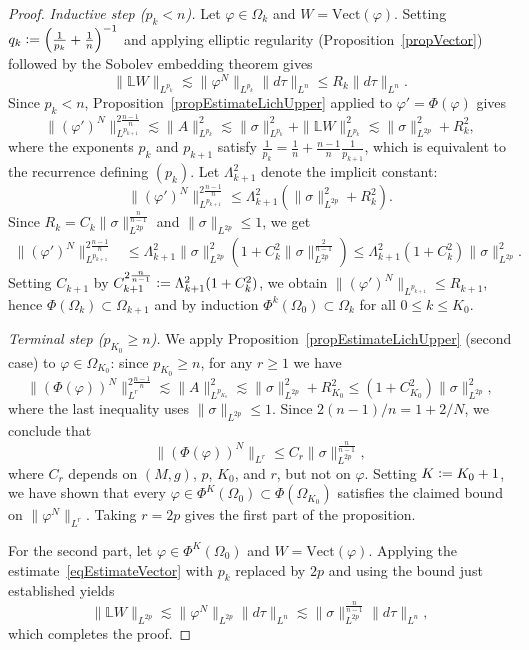 \documentclass[10pt,a4paper]{amsart}
\newcommand{\bL}{\mathbb{L}}
\newcommand{\definedas}{\mathrel{\raise.095ex\hbox{\rm :}\mkern-5.2mu=}}
\renewcommand{\phi}{\varphi}
\begin{document}
\begin{proof}
	\medskip\noindent\textit{Inductive step ($p_k < n$).}
	Let $\phi \in \Omega_k$ and $W = \mathrm{Vect}(\phi)$. Setting $q_k \definedas
		\left(\frac{1}{p_k}+\frac{1}{n}\right)^{-1}$ and applying elliptic regularity
	(Proposition~\ref{propVector}) followed by the Sobolev embedding theorem gives
	\begin{equation}\label{eqEstimateVector}
		\|\bL W\|_{L^{p_k}} \lesssim \|\phi^N\|_{L^{p_k}} \|d\tau\|_{L^n} \leq R_k \|d\tau\|_{L^n}.
	\end{equation}
	Since $p_k < n$, Proposition~\ref{propEstimateLichUpper} applied to $\phi' =
		\Phi(\phi)$ gives
	\[
		\|(\phi')^N\|_{L^{p_{k+1}}}^{2\frac{n-1}{n}}
		\lesssim \|A\|_{L^{p_k}}^2
		\lesssim \|\sigma\|_{L^{p_k}}^2 + \|\bL W\|_{L^{p_k}}^2
		\lesssim \|\sigma\|_{L^{2p}}^2 + R_k^2,
	\]
	where the exponents $p_k$ and $p_{k+1}$ satisfy $\frac{1}{p_k} = \frac{1}{n} +
		\frac{n-1}{n} \frac{1}{p_{k+1}}$, which is equivalent to the recurrence
	defining $(p_k)$. Let $\Lambda_{k+1}^2$ denote the implicit constant:
	\[
		\|(\phi')^N\|_{L^{p_{k+1}}}^{2\frac{n-1}{n}}
		\leq \Lambda_{k+1}^2 \left(\|\sigma\|_{L^{2p}}^2 + R_k^2\right).
	\]
	Since $R_k = C_k \|\sigma\|_{L^{2p}}^{\frac{n}{n-1}}$ and $\|\sigma\|_{L^{2p}}
		\leq 1$, we get
	\begin{align*}
		\|(\phi')^N\|_{L^{p_{k+1}}}^{2\frac{n-1}{n}}
		 & \leq \Lambda_{k+1}^2 \|\sigma\|_{L^{2p}}^2 \left(1 + C_k^2 \|\sigma\|_{L^{2p}}^{\frac{2}{n-1}}\right)
		\leq \Lambda_{k+1}^2 \left(1 + C_k^2\right) \|\sigma\|_{L^{2p}}^2.
	\end{align*}
	Setting $C_{k+1}$ by $C_{k+1}^{2\frac{n}{n-1}} \definedas \Lambda_{k+1}^2 (1 + C_k^2)$, we
	obtain $\|(\phi')^N\|_{L^{p_{k+1}}} \leq R_{k+1}$, hence $\Phi(\Omega_k) \subset
		\Omega_{k+1}$ and by induction $\Phi^k(\Omega_0) \subset \Omega_k$ for all
	$0 \leq k \leq K_0$.

	\medskip\noindent\textit{Terminal step ($p_{K_0} \geq n$).}
	We apply Proposition~\ref{propEstimateLichUpper} (second case) to
	$\phi \in \Omega_{K_0}$: since $p_{K_0} \geq n$, for any $r \geq 1$ we have
	\[
		\|(\Phi(\phi))^N\|_{L^r}^{2\frac{n-1}{n}}
		\lesssim \|A\|_{L^{p_{K_0}}}^2
		\lesssim \|\sigma\|_{L^{2p}}^2 + R_{K_0}^2
		\leq (1 + C_{K_0}^2)\|\sigma\|_{L^{2p}}^2,
	\]
	where the last inequality uses $\|\sigma\|_{L^{2p}} \leq 1$. Since $2(n-1)/n =
		1 + 2/N$, we conclude that
	\[
		\|(\Phi(\phi))^N\|_{L^r} \leq C_r \|\sigma\|_{L^{2p}}^{\frac{n}{n-1}},
	\]
	where $C_r$ depends on $(M, g)$, $p$, $K_0$, and $r$, but not on $\phi$.
	Setting $K \definedas K_0 + 1$, we have shown that every $\phi \in
		\Phi^K(\Omega_0) \subset \Phi(\Omega_{K_0})$ satisfies the claimed bound on
	$\|\phi^N\|_{L^r}$. Taking $r = 2p$ gives the first part of the proposition.

	\medskip

	For the second part, let $\phi \in \Phi^K(\Omega_0)$ and $W =
		\mathrm{Vect}(\phi)$. Applying the estimate~\eqref{eqEstimateVector} with $p_k$
	replaced by $2p$ and using the bound just established yields
	\[
		\|\bL W\|_{L^{2p}} \lesssim \|\phi^N\|_{L^{2p}} \|d\tau\|_{L^n}
		\lesssim \|\sigma\|_{L^{2p}}^{\frac{n}{n-1}} \|d\tau\|_{L^n},
	\]
	which completes the proof.
\end{proof}
\end{document}
